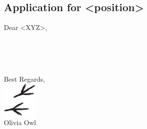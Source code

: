 \vspace{2cm}
\subsection*{Application for <position>}
\vspace{1cm}
{\normalsize

	Dear <XYZ>,\vspace{2\baselineskip}

	\lorem\lorem\lorem\lorem\lorem\lorem\\

	\lorem\lorem\lorem\lorem\lorem\lorem\\

	\lorem\lorem\lorem\lorem\lorem\lorem\\

	\lorem\lorem\lorem\lorem\lorem\lorem

	\vspace{2\baselineskip}
	Best Regards,\\[0.75\baselineskip]
	\includegraphics[height=1.75cm,keepaspectratio]{resources/sig.png}\\[\baselineskip]
	Olivia Owl
}
\closecolumnpage





